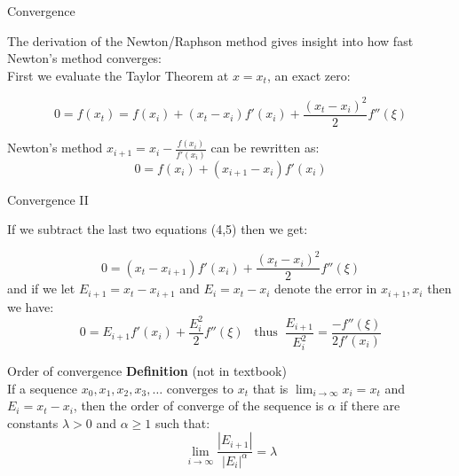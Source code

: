 \documentclass[12pt]{beamer}
\begin{document}
\begin{frame}{Convergence} 

  The derivation of the Newton/Raphson method gives insight into how
fast Newton's method converges:
\\
First we evaluate the Taylor Theorem at $x=x_t$, an exact zero: 

\begin{equation} 
0 = f(x_t) = f(x_i) + (x_t-x_i)f'(x_i) + \frac{(x_t-x_i)^2}{2}f''(\xi)
\end{equation} 

Newton's method $x_{i+1} = x_{i} - \frac{f(x_i)}{f'(x_i)}$ can be rewritten as: 
\begin{equation} 
0 = f(x_i) + (x_{i+1} -x_{i}) f'(x_{i})
\end{equation} 
\vspace{1 in}
\end{frame} 

\begin{frame}{Convergence II} 

If we subtract the last two equations (4,5) then we get: 

\begin{equation} 
0 = (x_t -x_{i+1}) f'(x_i) + \frac{(x_t - x_i)^2}{2}f''(\xi)
\end{equation} 
\noindent and if we let $E_{i+1} = x_t - x_{i+1}$ and $E_i = x_t - x_{i}$ denote the error in $x_{i+1}, x_i$ then we have: 
\[
0 = E_{i+1} f'(x_i) + \frac{E_i^2}{2} f''(\xi) \;\;\; \mbox{thus} \;\;
\frac{E_{i+1}}{E_i^2} = \frac{-f''(\xi)}{2f'(x_{i})} 
\]

\end{frame} 


\begin{frame}{Order of convergence}
{\bf Definition} (not in textbook) \\ 
If a sequence ${x_0, x_1, x_2, x_3, \dots }$ converges to $x_t$ that is 
$\lim_{i \rightarrow \infty}x_i = x_t$ and $E_i = x_t - x_i$, then the order of converge of the sequence is $\alpha$ if there are constants $\lambda > 0$ and $\alpha \geq 1$ such that: 
\begin{equation} 
\lim_{i \rightarrow \infty} \frac{|E_{i+1}|}{|E_i|^{\alpha}} = \lambda 
\end{equation} 
\end{frame} 
\end{document}
